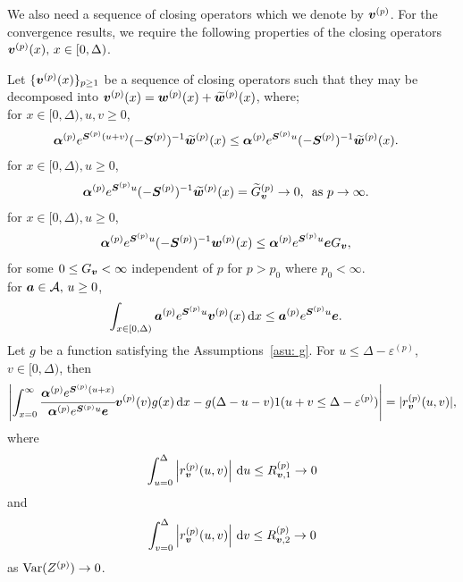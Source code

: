 We also need a sequence of closing operators which we denote by \({\boldsymbol v}^{(p)}\). For the convergence results, we require the following properties of the closing operators \({\boldsymbol v}^{(p)}(x),\, x \in[0,\Delta)\).
\begin{property}\label{properties: some props}
	Let \(\{\boldsymbol v^{(p)}(x)\}_{p\geq 1}\) be a sequence of closing operators such that they may be decomposed into \(\boldsymbol v^{(p)}(x)=\boldsymbol w^{(p)}(x) + \widetilde{\boldsymbol w}^{(p)}(x)\), where; \\
	\subproperty \label{properties: -1} for \(x\in[0,\Delta),u,v\geq 0\),  
        \begin{align*}
        		\boldsymbol \alpha^{(p)} e^{\boldsymbol S^{(p)}(u+v)}(-\boldsymbol S^{(p)})^{-1} \widetilde{\boldsymbol w}^{(p)}(x) &\leq \boldsymbol \alpha^{(p)} e^{\boldsymbol S^{(p)}u}(-\boldsymbol S^{(p)})^{-1} \widetilde{\boldsymbol w}^{(p)}(x).
		\end{align*}
	\subproperty \label{properties: 0} for \(x\in[0,\Delta),u\geq 0\),
		\begin{align*}
			\boldsymbol \alpha^{(p)} e^{\boldsymbol S^{(p)}u}(-\boldsymbol S^{(p)})^{-1} \widetilde{\boldsymbol w}^{(p)}(x) &=\widetilde G_{\boldsymbol v}^{(p)} \to 0,\, \mbox{ as }p \to \infty.  
		\end{align*}
	\subproperty \label{properties: 1} for \(x\in[0,\Delta),u\geq 0\),  
        \begin{align*}
        		\boldsymbol \alpha^{(p)} e^{\boldsymbol S^{(p)}u}(-\boldsymbol S^{(p)})^{-1} \boldsymbol w^{(p)}(x) &\leq \boldsymbol \alpha^{(p)} e^{\boldsymbol S^{(p)}u} \boldsymbol e G_{\boldsymbol v},
	\end{align*}
	for some \(0\leq G_{\boldsymbol v}<\infty\) independent of \(p\) for \(p>p_0\) where \(p_0<\infty\). \\
	\subproperty \label{properties: -2} for \(\boldsymbol a \in\mathcal A,\,u\geq 0\),  
	\begin{align*}
			\int_{x\in[0,\Delta)}\boldsymbol a^{(p)} e^{\boldsymbol S^{(p)}u} {\boldsymbol v}^{(p)}(x) \, \mathrm{d} x&\leq \boldsymbol a^{(p)} e^{\boldsymbol S^{(p)}u} \boldsymbol e.
	\end{align*}
	\subproperty \label{properties: 2} Let \(g\) be a function satisfying the Assumptions~\ref{asu: g}. For \(u\leq \Delta-\varepsilon^{(p)}\), \(v\in[0,\Delta)\), then
	\[\left|\int_{x=0}^\infty \cfrac{\boldsymbol \alpha^{(p)} e^{\boldsymbol{S}^{(p)}(u+x)} }{\boldsymbol \alpha^{(p)} e^{\boldsymbol{S}^{(p)}u} \boldsymbol e} {\boldsymbol v}^{(p)}(v)g(x)\, \mathrm{d} x -g(\Delta-u-v) 1(u+v\leq\Delta-\varepsilon^{(p)})\right| =  |r_{\boldsymbol v}^{(p)}(u,v)|,\]
	where 
	\[ \int_{u=0}^{\Delta}\left| r_{\boldsymbol v}^{(p)}(u,v)\right| \, \mathrm{d} u  \leq R_{{\boldsymbol v},1}^{(p)} \to 0\]
	and 
	\[ \int_{v=0}^{\Delta}\left| r_{\boldsymbol v}^{(p)}(u,v)\right| \, \mathrm{d} v  \leq R_{{\boldsymbol v},2}^{(p)} \to 0\]
	as \(\mathrm{Var}(Z^{(p)})\to 0\). 
\end{property}

